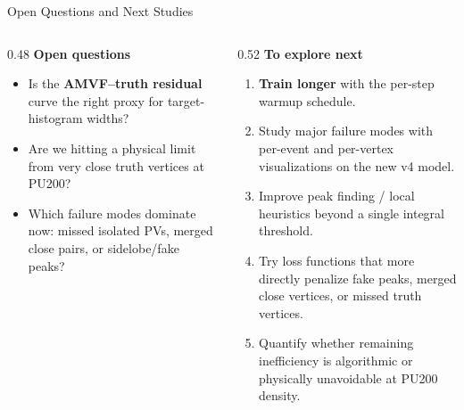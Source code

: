 \documentclass[xcolor=table,aspectratio=169]{beamer}
\begin{document}
\begin{frame}{Open Questions and Next Studies}
    \begin{columns}[t]
        \begin{column}{0.48\linewidth}
            \small
            \textbf{Open questions}
            \vspace{0.3em}
            \begin{itemize}\setlength\itemsep{0.35em}
                \item Is the \textbf{AMVF--truth residual} curve the right proxy
                for target-histogram widths?
                \item Are we hitting a physical limit from very close truth
                vertices at PU200?
                \item Which failure modes dominate now: missed isolated PVs,
                merged close pairs, or sidelobe/fake peaks?
            \end{itemize}
        \end{column}
        \begin{column}{0.52\linewidth}
            \small
            \textbf{To explore next}
            \vspace{0.3em}
            \begin{enumerate}\setlength\itemsep{0.35em}
                \item \textbf{Train longer} with the per-step warmup schedule.
                \item Study major failure modes with per-event and per-vertex
                visualizations on the new v4 model.
                \item Improve peak finding / local heuristics beyond a single
                integral threshold.
                \item Try loss functions that more directly penalize fake peaks,
                merged close vertices, or missed truth vertices.
                \item Quantify whether remaining inefficiency is algorithmic or
                physically unavoidable at PU200 density.
            \end{enumerate}
        \end{column}
    \end{columns}
\end{frame}
\end{document}
